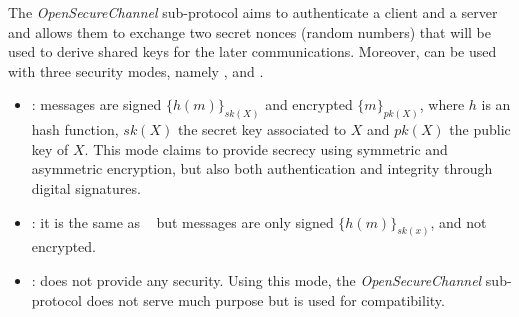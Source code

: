 \newcommand{\gereq}{GEReq}
\newcommand{\geres}{GERes}
\newcommand{\oscreq}{OSCReq}
\newcommand{\oscres}{OSCRes}


The {\em OpenSecureChannel} sub-protocol aims to authenticate a client
and a server and allows them to exchange two secret nonces (random
numbers) that will be used to derive shared keys for the later
communications.  Moreover, \opcua{} can be used with three security
modes, namely {\em \smn}, {\em \sms} and {\em \smse}.
\vspace{-.5em}
\begin{itemize}
    \item {\em \smse}: messages are signed $\{h(m)\}_{sk(X)}$ and
      encrypted $\{m\}_{pk(X)}$, where $h$ is an hash function, $sk(X)$ the
      secret key associated to $X$ and $pk(X)$ the public key of $X$.
      This mode claims to provide secrecy
      using symmetric and asymmetric encryption, but also both
      authentication and integrity through digital signatures.
  \item {\em \sms}: it is the same as \smse~ but messages are only signed
      $\{h(m)\}_{sk(x)}$, and not encrypted.
  \item {\em \smn}: does not provide any security.  Using this mode, the
      {\em OpenSecureChannel} sub-protocol does not serve much
      purpose but is used for compatibility.
\end{itemize}

